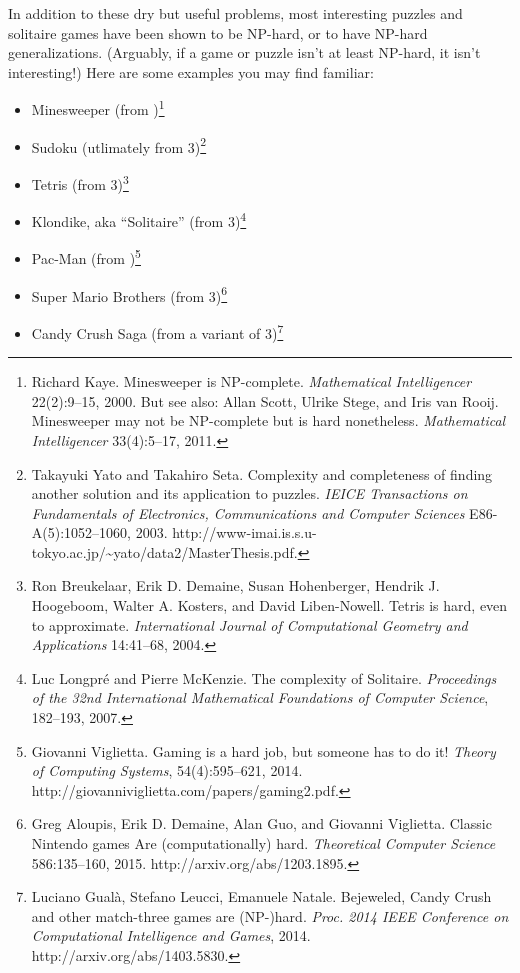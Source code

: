 In addition to these dry but useful problems, most interesting puzzles and solitaire games have been shown to be NP-hard, or to have NP-hard generalizations.
(Arguably, if a game or puzzle isn’t at least NP-hard, it isn’t interesting!)
Here are some examples you may find familiar:
\begin{itemize}
\item Minesweeper (from )\footnote{Richard Kaye. Minesweeper is NP-complete. \textit{Mathematical Intelligencer} 22(2):9--15, 2000. But see also: Allan Scott, Ulrike Stege, and Iris van Rooij. Minesweeper may not be NP-complete but is hard nonetheless. \textit{Mathematical Intelligencer} 33(4):5--17, 2011.}
\item Sudoku (utlimately from 3)\footnote{Takayuki Yato and Takahiro Seta. Complexity and completeness of finding another solution and its application to puzzles. \textit{IEICE Transactions on Fundamentals of Electronics, Communications and Computer Sciences} E86-A(5):1052--1060, 2003. http://www-imai.is.s.u-tokyo.ac.jp/\textasciitilde yato/data2/MasterThesis.pdf.}
\item Tetris (from 3)\footnote{Ron Breukelaar, Erik D. Demaine, Susan Hohenberger, Hendrik J. Hoogeboom, Walter A. Kosters, and David Liben-Nowell. Tetris is hard, even to approximate. \textit{International Journal of Computational Geometry and Applications} 14:41--68, 2004.}
\item Klondike, aka “Solitaire” (from 3)\footnote{Luc Longpré and Pierre McKenzie. The complexity of Solitaire. \textit{Proceedings of the 32nd International Mathematical Foundations of Computer Science}, 182--193, 2007.}
\item Pac-Man (from )\footnote{Giovanni Viglietta. Gaming is a hard job, but someone has to do it! \textit{Theory of Computing Systems}, 54(4):595--621, 2014. http://giovanniviglietta.com/papers/gaming2.pdf.}
\item Super Mario Brothers (from 3)\footnote{Greg Aloupis, Erik D. Demaine, Alan Guo, and Giovanni Viglietta. Classic Nintendo games Are (computationally) hard. \textit{Theoretical Computer Science} 586:135--160, 2015. http://arxiv.org/abs/1203.1895.}
\item Candy Crush Saga (from a variant of 3)\footnote{Luciano Gualà, Stefano Leucci, Emanuele Natale. Bejeweled, Candy Crush and other match-three games are (NP-)hard. \textit{Proc. 2014 IEEE Conference on Computational Intelligence and Games}, 2014. http://arxiv.org/abs/1403.5830.}

\end{itemize}
